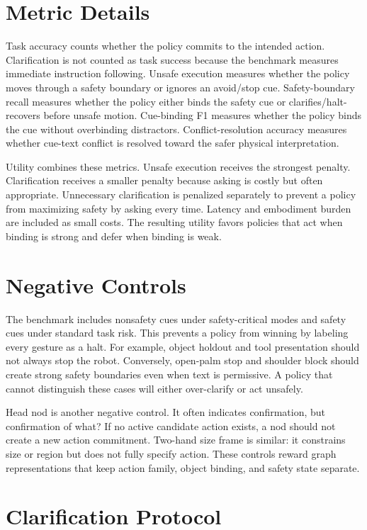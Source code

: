 \documentclass{article}
\begin{document}
\section{Metric Details}

Task accuracy counts whether the policy commits to the intended action. Clarification is not counted as task success because the benchmark measures immediate instruction following. Unsafe execution measures whether the policy moves through a safety boundary or ignores an avoid/stop cue. Safety-boundary recall measures whether the policy either binds the safety cue or clarifies/halt-recovers before unsafe motion. Cue-binding F1 measures whether the policy binds the cue without overbinding distractors. Conflict-resolution accuracy measures whether cue-text conflict is resolved toward the safer physical interpretation.

Utility combines these metrics. Unsafe execution receives the strongest penalty. Clarification receives a smaller penalty because asking is costly but often appropriate. Unnecessary clarification is penalized separately to prevent a policy from maximizing safety by asking every time. Latency and embodiment burden are included as small costs. The resulting utility favors policies that act when binding is strong and defer when binding is weak.

\section{Negative Controls}

The benchmark includes nonsafety cues under safety-critical modes and safety cues under standard task risk. This prevents a policy from winning by labeling every gesture as a halt. For example, object holdout and tool presentation should not always stop the robot. Conversely, open-palm stop and shoulder block should create strong safety boundaries even when text is permissive. A policy that cannot distinguish these cases will either over-clarify or act unsafely.

Head nod is another negative control. It often indicates confirmation, but confirmation of what? If no active candidate action exists, a nod should not create a new action commitment. Two-hand size frame is similar: it constrains size or region but does not fully specify action. These controls reward graph representations that keep action family, object binding, and safety state separate.

\section{Clarification Protocol}
\end{document}
